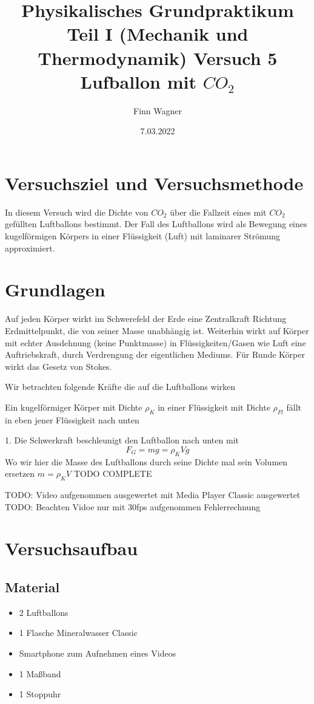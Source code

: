 \documentclass{article}
\date{7.03.2022}
\title{Physikalisches Grundpraktikum Teil I (Mechanik und Thermodynamik) Versuch 5 Lufballon mit \(CO_2\)}
\author{Finn Wagner}
\begin{document}
    \maketitle

    \section{Versuchsziel und Versuchsmethode}
    In diesem Versuch wird die Dichte von \(CO_2\) über die Fallzeit eines mit \(CO_2\) gefüllten Luftballons bestimmt.
    Der Fall des Luftballons wird als Bewegung eines kugelförmigen Körpers in einer Flüssigkeit (Luft) mit laminarer Strömung approximiert.

    \section{Grundlagen}
    Auf jeden Körper wirkt im Schwerefeld der Erde eine Zentralkraft Richtung Erdmittelpunkt, die von seiner Masse unabhängig ist.
    Weiterhin wirkt auf Körper mit echter Ausdehnung (keine Punktmasse) in Flüssigkeiten/Gasen wie Luft eine Auftriebskraft, 
    durch Verdrengung der eigentlichen Mediums.
    Für Runde Körper wirkt das Gesetz von Stokes.

    Wir betrachten folgende Kräfte die auf die Luftballons wirken

    Ein kugelförmiger Körper mit Dichte \(\rho_K\) in einer Flüssigkeit mit Dichte \(\rho_{Fl}\) fällt in eben jener Flüssigkeit nach unten

    1. Die Schwerkraft beschleunigt den Luftballon nach unten mit
    \[ F_G = mg = \rho_K V g \]
    Wo wir hier die Masse des Luftballons durch seine Dichte mal sein Volumen ersetzen \( m = \rho_K V \)
    TODO COMPLETE

    TODO: Video aufgenommen ausgewertet mit Media Player Classic ausgewertet
    TODO: Beachten Vidoe nur mit 30fps aufgenommen Fehlerrechnung

    \section{Versuchsaufbau}
        \subsection{Material}
        \begin{itemize}
            \item 2 Luftballons
            \item 1 Flasche Mineralwasser Classic
            \item Smartphone zum Aufnehmen eines Videos
            \item 1 Maßband
            \item 1 Stoppuhr
        \end{itemize}
\end{document}

